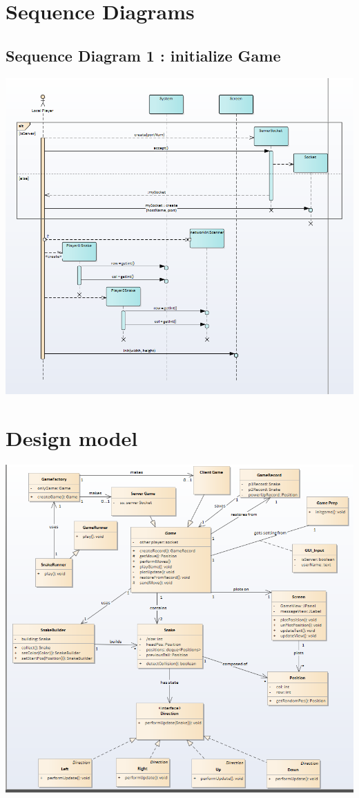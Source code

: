 \documentclass[titlepage]{article}
\begin{document}
	
	
	\section{Sequence Diagrams}
	\subsection{Sequence Diagram 1 : initialize Game}
	\includegraphics[scale=.75]{Sequence1}
	
	\section{Design model}
	\includegraphics[scale=.75]{DesignModel_better}
	
\end{document}
